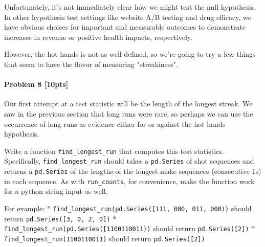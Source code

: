 \documentclass[11pt]{article}
\begin{document}
Unfortunately, it's not immediately clear how we might test the null
hypothesis. In other hypothesis test settings like website A/B testing
and drug efficacy, we have obvious choices for important and measurable
outcomes to demonstrate increases in revenue or positive health impacts,
respectively.

However, the hot hands is not as well-defined, so we're going to try a
few things that seem to have the flavor of measuring "streakiness".

\paragraph{Problem 8 {[}10pts{]}}\label{problem-8-10pts}

Our first attempt at a test statistic will be the length of the longest
streak. We saw in the previous section that long runs were rare, so
perhaps we can use the occurrence of long runs as evidence either for or
against the hot hands hypothesis.

Write a function \texttt{find\_longest\_run} that computes this test
statistics. Specifically, \texttt{find\_longest\_run} should takes a
\texttt{pd.Series} of shot sequences and returns a \texttt{pd.Series} of
the lengths of the longest make sequences (consecutive 1s) in each
sequence. As with \texttt{run\_counts}, for convenience, make the
function work for a python string input as well.

For example: *
\texttt{find\_longest\_run(pd.Series({[}\textquotesingle{}111\textquotesingle{},\ \textquotesingle{}000\textquotesingle{},\ \textquotesingle{}011\textquotesingle{},\ \textquotesingle{}000\textquotesingle{}{]}))}
should return \texttt{pd.Series({[}3,\ 0,\ 2,\ 0{]})} *
\texttt{find\_longest\_run(pd.Series({[}\textquotesingle{}1100110011\textquotesingle{}{]}))}
should return \texttt{pd.Series({[}2{]})} *
\texttt{find\_longest\_run(\textquotesingle{}1100110011\textquotesingle{})}
should return \texttt{pd.Series({[}2{]})}
\end{document}
